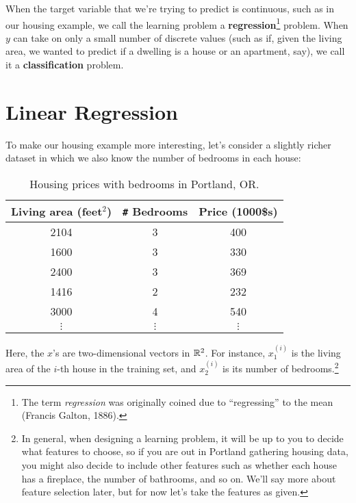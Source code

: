 When the target variable that we're trying to predict is continuous, such
as in our housing example, we call the learning problem a \textbf{regression}\footnote{The term \textit{regression} was originally coined due to ``regressing'' to the mean (Francis Galton, 1886).} problem. %
When $y$ can take on only a small number of discrete values (such as
if, given the living area, we wanted to predict if a dwelling is a house or an
apartment, say), we call it a \textbf{classification} problem.


\chapter{Linear Regression}
\label{cha:linear_regression}

To make our housing example more interesting, let's consider a slightly richer
dataset in which we also know the number of bedrooms in each house:


\begin{table}[!h]
  \centering
  \caption{
    \label{tab:bedrooms} Housing prices with bedrooms in Portland, OR.
  }
  \begin{tabular}{ccc}
    \toprule
    Living area (feet$^2$) & \texttt{\#} Bedrooms & Price (1000\$s) \\
    \midrule
    2104 & 3 & 400 \\
    1600 & 3 & 330 \\
    2400 & 3 & 369 \\
    1416 & 2 & 232 \\
    3000 & 4 & 540 \\
    $\vdots$ & $\vdots$ & $\vdots$ \\
    \bottomrule
  \end{tabular}
\end{table}

Here, the $x$'s are two-dimensional vectors in $\mathbb{R}^2$. For instance, $x^{(i)}_1$
is the living area of the $i$-th house in the training set, and $x^{(i)}_2$
is its number of bedrooms.\footnote{In general, when designing a learning problem, it will be up to %
you to decide what features to choose, so if you are out in Portland gathering
housing data, you might also decide to include other features such as whether
each house has a fireplace, the number of bathrooms, and so on. We'll say
more about feature selection later, but for now let's take the features as
given.}

